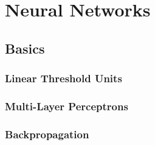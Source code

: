 \chapter{Neural Networks}
\section{Basics}


\subsection{Linear Threshold Units}

\subsection{Multi-Layer Perceptrons}

\subsection{Backpropagation}

